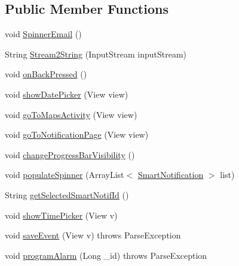 \subsection*{Public Member Functions}
\begin{DoxyCompactItemize}
\item 
void \hyperlink{classcom_1_1agenda_1_1ter_1_1smartgenda_1_1_event_activity_a46c910f09f0de74eabb9f0b37acd6c37}{Spinner\-Email} ()
\item 
String \hyperlink{classcom_1_1agenda_1_1ter_1_1smartgenda_1_1_event_activity_a5df00e370158e875ab92ac721f6a34c9}{Stream2\-String} (Input\-Stream input\-Stream)
\item 
void \hyperlink{classcom_1_1agenda_1_1ter_1_1smartgenda_1_1_event_activity_a1c9963197c2e47da56fd6668546b4815}{on\-Back\-Pressed} ()
\item 
void \hyperlink{classcom_1_1agenda_1_1ter_1_1smartgenda_1_1_event_activity_acf97e7bbe1c7e811dedd9426c73f4ccc}{show\-Date\-Picker} (View view)
\item 
void \hyperlink{classcom_1_1agenda_1_1ter_1_1smartgenda_1_1_event_activity_abad23833bca6be84e808f73da23615fc}{go\-To\-Maps\-Activity} (View view)
\item 
void \hyperlink{classcom_1_1agenda_1_1ter_1_1smartgenda_1_1_event_activity_ae1989ef99894abde945b15729429f3d3}{go\-To\-Notification\-Page} (View view)
\item 
void \hyperlink{classcom_1_1agenda_1_1ter_1_1smartgenda_1_1_event_activity_a6b3f02719b7f134b7888ceec5003bdd3}{change\-Progress\-Bar\-Visibility} ()
\item 
void \hyperlink{classcom_1_1agenda_1_1ter_1_1smartgenda_1_1_event_activity_aa6ac3a9efc600c7a19300c6d32e2e122}{populate\-Spinner} (Array\-List$<$ \hyperlink{classcom_1_1agenda_1_1ter_1_1model_1_1_smart_notification}{Smart\-Notification} $>$ list)
\item 
String \hyperlink{classcom_1_1agenda_1_1ter_1_1smartgenda_1_1_event_activity_ae98f623ba589cc888d9f4d4e0660a8ad}{get\-Selected\-Smart\-Notif\-Id} ()
\item 
void \hyperlink{classcom_1_1agenda_1_1ter_1_1smartgenda_1_1_event_activity_a33b346160481ef82591a53c82a86766f}{show\-Time\-Picker} (View v)
\item 
void \hyperlink{classcom_1_1agenda_1_1ter_1_1smartgenda_1_1_event_activity_ace5a0ec0600b52babe96d4eea7195d68}{save\-Event} (View v)  throws Parse\-Exception 
\item 
void \hyperlink{classcom_1_1agenda_1_1ter_1_1smartgenda_1_1_event_activity_a2108bf90c3f9ab8b73a9601c5dda8158}{program\-Alarm} (Long \-\_\-id)  throws Parse\-Exception 
\end{DoxyCompactItemize}
